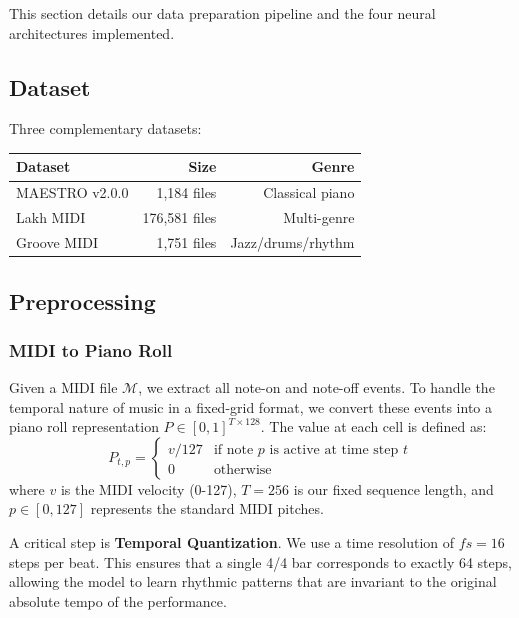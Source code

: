 \documentclass[conference]{IEEEtran}
\begin{document}
This section details our data preparation pipeline and the four neural architectures implemented.

\subsection{Dataset}
Three complementary datasets:
\begin{table}[h]
\centering
\begin{tabular}{lrr}
\toprule
Dataset & Size & Genre \\
\midrule
MAESTRO v2.0.0 & 1,184 files & Classical piano \\
Lakh MIDI & 176,581 files & Multi-genre \\
Groove MIDI & 1,751 files & Jazz/drums/rhythm \\
\bottomrule
\end{tabular}
\end{table}

\subsection{Preprocessing}

\subsubsection{MIDI to Piano Roll}
Given a MIDI file $\mathcal{M}$, we extract all note-on and note-off events. To handle the temporal nature of music in a fixed-grid format, we convert these events into a piano roll representation $P \in [0,1]^{T \times 128}$. The value at each cell is defined as:
\begin{equation}
P_{t,p} = \begin{cases}
v/127 & \text{if note } p \text{ is active at time step } t \\
0 & \text{otherwise}
\end{cases}
\end{equation}
where $v$ is the MIDI velocity (0-127), $T=256$ is our fixed sequence length, and $p \in [0, 127]$ represents the standard MIDI pitches. 

A critical step is \textbf{Temporal Quantization}. We use a time resolution of $fs = 16$ steps per beat. This ensures that a single 4/4 bar corresponds to exactly 64 steps, allowing the model to learn rhythmic patterns that are invariant to the original absolute tempo of the performance.

\end{document}
